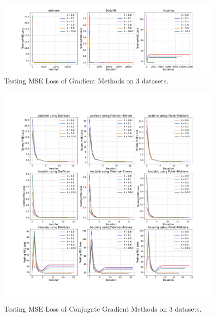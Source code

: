 \begin{figure}[!htbp]
    \centering
    \includegraphics[scale = 0.28]{fig/Grad.pdf}
    \caption{Testing MSE Loss of Gradient Methods on \(3\) datasets.}
    \label{fig:grad}
\end{figure}

\begin{figure}[!htbp]
    \centering
    \includegraphics[scale = 0.28]{fig/ConjGrad.pdf}
    \caption{Testing MSE Loss of Conjugate Gradient Methods on \(3\) datasets.}
    \label{fig:conjgrad}
\end{figure}

